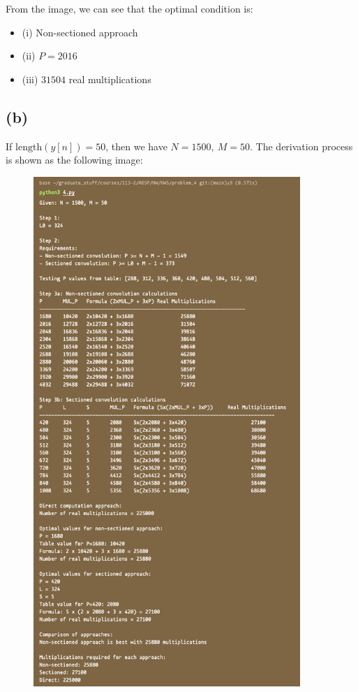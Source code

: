 \documentclass{article}
\begin{document}
From the image, we can see that the optimal condition is: 
\begin{itemize}
    \item (i) Non-sectioned approach
    \item (ii) $P = 2016$
    \item (iii) $31504$ real multiplications
\end{itemize}

\subsection*{(b)}

If $\mathrm{length}(y[n]) = 50$, then we have $N = 1500, \ M = 50$.
The derivation process is shown as the following image:

\begin{figure}[H]
    \centering
    \includegraphics[width=0.9\textwidth]{problem_4/4_b.png}
\end{figure}
\end{document}
